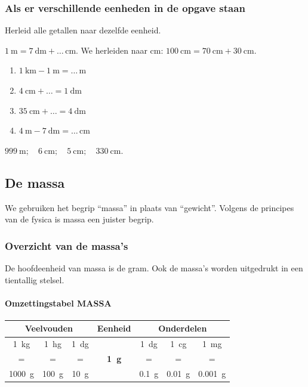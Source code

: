 \documentclass{bis}
\begin{document}
\subsubsection{Als er verschillende eenheden in de opgave staan}
Herleid alle getallen naar dezelfde eenheid.

\begin{voorbeeld}
\(\SI{1}{\metre}=\SI{7}{\deci\metre}+\ldots\,\si{\centi\metre}\). We herleiden naar \si{\centi\metre}: \(\SI{100}{\centi\metre}=\SI{70}{\centi\metre}+\SI{30}{\centi\metre}\).
\end{voorbeeld}

\begin{exercise}
\begin{enumerate}
  \item \(\SI{1}{\kilo\metre}-\SI{1}{\metre}=\ldots\,\si{\metre}\)
  \item \(\SI{4}{\centi\metre}+\ldots=\SI{1}{\deci\metre}\)
  \item \(\SI{35}{\centi\metre}+\ldots=\SI{4}{\deci\metre}\)
  \item \(\SI{4}{\metre}-\SI{7}{\deci\metre}=\ldots\,\si{\centi\metre}\)
\end{enumerate}
\end{exercise}

\begin{solution}
\(\SI{999}{\metre};\quad \SI{6}{\centi\metre};\quad \SI{5}{\centi\metre};\quad \SI{330}{\centi\metre}.\)
\end{solution}

\subsection{De massa}
We gebruiken het begrip ``massa'' in plaats van ``gewicht''. Volgens de principes van de fysica is massa een juister begrip.

\subsubsection{Overzicht van de massa's}
De hoofdeenheid van massa is de gram. Ook de massa's worden uitgedrukt in een tientallig stelsel.

\paragraph{Omzettingstabel MASSA}
\begin{center}
\renewcommand{\arraystretch}{1.2}\setlength{\tabcolsep}{4pt}%
\begin{tabular}{*{7}{c}}
  \multicolumn{3}{c}{\textbf{Veelvouden}} & \textbf{Eenheid} & \multicolumn{3}{c}{\textbf{Onderdelen}}\\
  \midrule
\SI{1}{\kilo\gram} & \SI{1}{\hecto\gram} & \SI{1}{\deca\gram} &  & \SI{1}{\deci\gram} & \SI{1}{\centi\gram} & \SI{1}{\milli\gram}\\
= & = & = & \textbf{\SI{1}{\gram}} & = & = & =\\
\SI{1000}{\gram} & \SI{100}{\gram} & \SI{10}{\gram} & & \SI{0.1}{\gram} & \SI{0.01}{\gram} & \SI{0.001}{\gram}
\end{tabular}%
\end{center}
\end{document}
